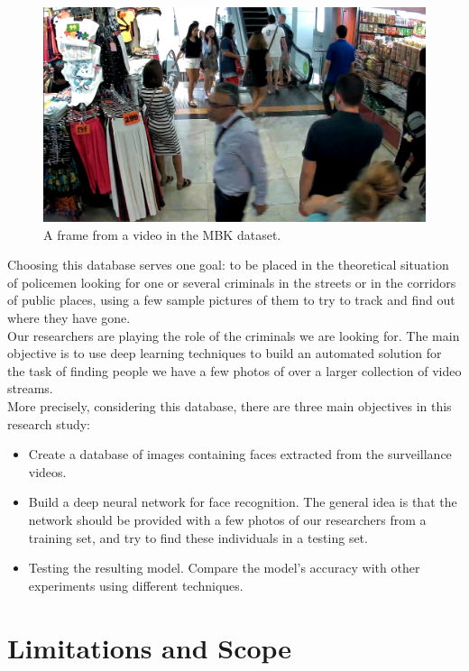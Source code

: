 \begin{figure}[t]
  \centering
  \includegraphics[scale=0.3]{figures/database.png}  
  \caption[A frame from a video in the MBK dataset.]{A frame from a video in the MBK dataset.}
  \label{fig:example}
\end{figure}

Choosing this database serves one goal: to be placed in the theoretical situation of policemen looking for one or several criminals in the streets or in the corridors of public places, using a few sample pictures of them to try to track and find out where they have gone.\\

Our researchers are playing the role of the criminals we are looking for.
The main objective is to use deep learning techniques to build an automated solution for the task of finding people we have a few photos of over a larger collection of video streams.\\

More precisely, considering this database, there are three main objectives in this research study:
\begin{itemize}
\item Create a database of images containing faces extracted from the surveillance videos.
\item Build a deep neural network for face recognition. The general idea is that the network should be provided with a few photos of our researchers from a training set, and try to find these individuals in a testing set.
\item Testing the resulting model. Compare the model's accuracy with other experiments using different techniques.
\end{itemize}

\section{Limitations and Scope}

